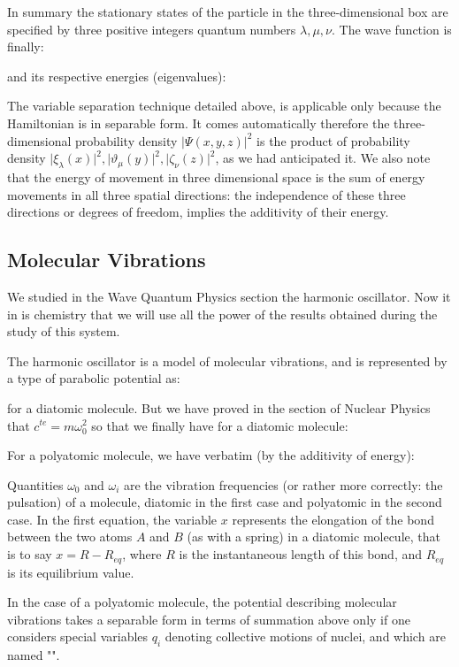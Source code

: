 	In summary the stationary states of the particle in the three-dimensional box are specified by three positive integers quantum numbers $\lambda, \mu, \nu$. The wave function is finally:
	
	and its respective energies (eigenvalues):
	
	The variable separation technique detailed above, is applicable only because the Hamiltonian is in separable form. It comes automatically therefore the three-dimensional probability density $\vert \Psi(x,y,z) \vert^2$ is the product of probability density $\vert \xi_\lambda(x)\vert^2,\vert \vartheta_\mu(y)\vert^2,\vert \zeta_\nu(z)\vert^2$, as we had anticipated it. We also note that the energy of movement in three dimensional space is the sum of energy movements in all three spatial directions: the independence of these three directions or degrees of freedom, implies the additivity of their energy.
	
	\subsection{Molecular Vibrations}
	We studied in the Wave Quantum Physics section the harmonic oscillator. Now it in is chemistry that we will use all the power of the results obtained during the study of this system.
	
	The harmonic oscillator is a model of molecular vibrations, and is represented by a type of parabolic potential as:
	
	for a diatomic molecule. But we have proved in the section of Nuclear Physics that $c^{te}=m\omega_0^2$ so that we finally have for a diatomic molecule:
	
	For a polyatomic molecule, we have verbatim (by the additivity of energy):
	
	Quantities $\omega_0$ and $\omega_i$ are the vibration frequencies (or rather more correctly: the pulsation) of a molecule, diatomic in the first case and polyatomic in the second case. In the first equation, the variable $x$ represents the elongation of the bond between the two atoms $A$ and $B$ (as with a spring) in a diatomic molecule, that is to say $x=R-R_{eq}$, where $R$ is the instantaneous length of this bond, and $R_{eq}$ is its equilibrium value.
	
	In the case of a polyatomic molecule, the potential describing molecular vibrations takes a separable form in terms of summation above only if one considers special variables $q_i$ denoting collective motions of nuclei, and which are named "".
	
